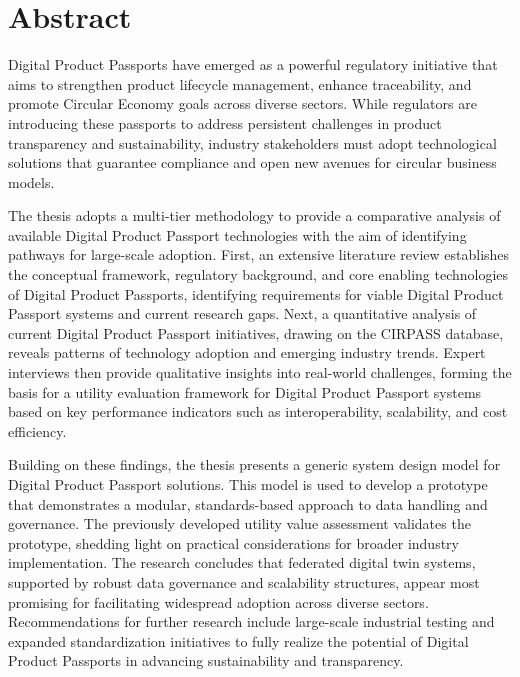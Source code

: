 
\chapter*{Abstract}
\thispagestyle{empty}

Digital Product Passports have emerged as a powerful regulatory initiative that aims to strengthen product lifecycle management, enhance traceability, and promote Circular Economy goals across diverse sectors. While regulators are introducing these passports to address persistent challenges in product transparency and sustainability, industry stakeholders must adopt technological solutions that guarantee compliance and open new avenues for circular business models.

The thesis adopts a multi-tier methodology to provide a comparative analysis of available Digital Product Passport technologies with the aim of identifying pathways for large-scale adoption. First, an extensive literature review establishes the conceptual framework, regulatory background, and core enabling technologies of Digital Product Passports, identifying requirements for viable Digital Product Passport systems and current research gaps. Next, a quantitative analysis of current Digital Product Passport initiatives, drawing on the CIRPASS database, reveals patterns of technology adoption and emerging industry trends. Expert interviews then provide qualitative insights into real-world challenges, forming the basis for a utility evaluation framework for Digital Product Passport systems based on key performance indicators such as interoperability, scalability, and cost efficiency.

Building on these findings, the thesis presents a generic system design model for Digital Product Passport solutions. This model is used to develop a prototype that demonstrates a modular, standards-based approach to data handling and governance. The previously developed utility value assessment validates the prototype, shedding light on practical considerations for broader industry implementation. The research concludes that federated digital twin systems, supported by robust data governance and scalability structures, appear most promising for facilitating widespread adoption across diverse sectors. Recommendations for further research include large-scale industrial testing and expanded standardization initiatives to fully realize the potential of Digital Product Passports in advancing sustainability and transparency.

